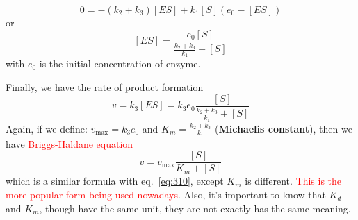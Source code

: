 \begin{equation}
  \label{eq:277}
  0= -(k_2 + k_3)[ES] + k_1[S](e_0-[ES])
\end{equation}
or
\begin{equation}
  \label{eq:300}
  [ES] = \frac{e_0[S]}{\frac{k_2+k_3}{k_1} + [S]}
\end{equation}
with $e_0$ is the initial concentration of enzyme.

Finally, we have the rate of product formation
\begin{equation}
  \label{eq:299}
  v = k_3[ES] = k_3e_0\frac{[S]}{\frac{k_2+k_3}{k_1} + [S]}
\end{equation}
Again, if we define: $v_\max=k_3e_0$ and $K_m=\frac{k_2+k_3}{k_1}$
({\bf Michaelis constant}), then we have \textcolor{red}{Briggs-Haldane
equation}
\begin{equation}
  \label{eq:301}
  v = v_\max \frac{[S]}{K_m+[S]}
\end{equation}
which is a similar formula with eq.~\eqref{eq:310}, except $K_m$ is
different.
\textcolor{red}{This is the more popular form being used nowadays}. Also, it's
important to know that $K_d$ and $K_m$, though have the same unit, they are not
exactly has the same meaning.




